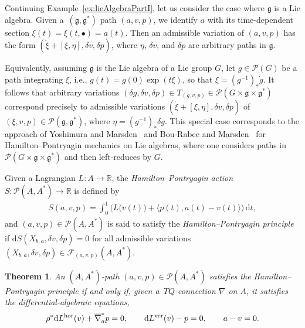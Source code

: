 \documentclass[10pt,a4paper]{amsart}
\numberwithin{equation}{section}
\newtheorem{Theorem}{Theorem}[section]
\begin{document}
\begin{Example} Continuing Example~\ref{ex:lieAlgebraPartI}, let us consider the case where $ \mathfrak{g} $ is a Lie algebra. Given a~$ ( \mathfrak{g} , \mathfrak{g} ^\ast ) $ path $ ( a, v, p ) $, we identify $a$ with its time-dependent section $ \xi (t) = \xi ( t, \bullet ) = a (t) $. Then an admissible
 variation of $ ( a, v, p ) $ has the form $ ( \dot{ \xi } + [ \xi, \eta ] , \delta v , \delta p ) $, where $ \eta $, $ \delta v $, and $ \delta p $ are arbitrary paths in $ \mathfrak{g} $.

Equivalently, assuming $\mathfrak{g}$ is the Lie algebra of a Lie group $G$, let $ g \in \mathcal{P} (G) $ be a path integrating $\xi$, i.e., $ g (t) = g (0) \exp( t \xi ) $, so that $ \xi = ( g ^{-1} ) _\ast \dot{g} $. It follows that arbitrary variations $ ( \delta g , \delta v, \delta p ) \in T _{ (g,v,p) } \in \mathcal{P} ( G \times \mathfrak{g} \times \mathfrak{g} ^\ast ) $ correspond precisely to admissible variations $ ( \dot{ \xi } + [ \xi, \eta ] , \delta v , \delta p ) $ of $ ( \xi, v, p ) \in \mathcal{P} ( \mathfrak{g} , \mathfrak{g} ^\ast ) $, where $ \eta = ( g ^{-1} ) _\ast \delta g $. This special case corresponds to the approach of Yoshimura and Marsden~\cite{YoMa2007} and Bou-Rabee and Marsden~\cite{BoMa2009} for Hamilton--Pontryagin mechanics on Lie algebras, where one considers paths in $ \mathcal{P} ( G \times \mathfrak{g} \times \mathfrak{g} ^\ast ) $ and then left-reduces by $G$.
\end{Example}

\begin{Definition}
Given a Lagrangian $ L \colon A \rightarrow \mathbb{R} $, the \emph{Hamilton--Pontryagin action} $ S \colon \mathcal{P} ( A , A ^\ast ) \rightarrow \mathbb{R} $ is def\/ined by
 \begin{gather*}
 S ( a, v , p ) = \int _0 ^1 \bigl( L \bigl( v (t) \bigr) + \bigl\langle p (t) , a (t) - v (t) \bigr\rangle \bigr) \,\mathrm{d}t ,
 \end{gather*}
and $ (a,v,p) \in \mathcal{P} ( A , A ^\ast ) $ is said to satisfy the \emph{Hamilton--Pontryagin principle} if $ \mathrm{d} S ( X _{ b, a } , \delta v , \delta p ) = 0 $ for all admissible variations $ ( X _{ b, a }, \delta v , \delta p ) \in \mathcal{F} _{ (a,v,p) } ( A, A ^\ast ) $.
\end{Definition}

\begin{Theorem}An $ ( A, A ^\ast ) $-path $ ( a, v , p ) \in \mathcal{P} ( A, A ^\ast ) $ satisfies the Hamilton--Pontryagin principle if and only if, given a~$ T Q $-connection $ \nabla $ on $A$, it satisfies the differential-algebraic equations,
 \begin{gather} \label{eqn:implicitELP}
 \rho ^\ast \mathrm{d} L ^\textup{hor} (v) + \overline{ \nabla } _a ^\ast p = 0 , \qquad \mathrm{d} L ^\textup{ver} (v) - p = 0 , \qquad a - v = 0 .
 \end{gather}
\end{Theorem}
\end{document}
